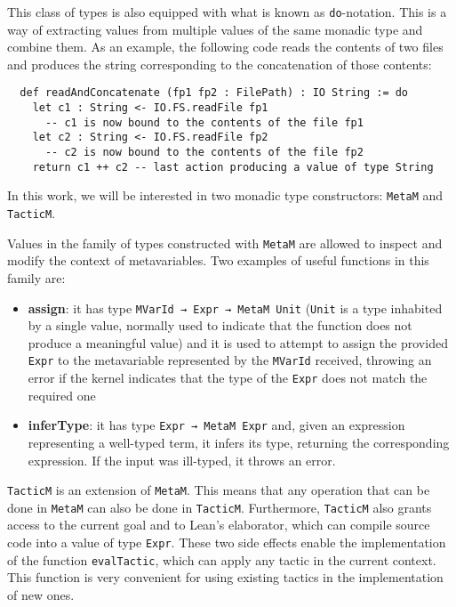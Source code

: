 This class of types is also equipped with what is known as \texttt{do}-notation. This is a way of extracting values from multiple values of the same monadic type and combine them. As an example, the following code reads the contents of two files and produces the string corresponding to the concatenation of those contents:

\begin{verbatim}
  def readAndConcatenate (fp1 fp2 : FilePath) : IO String := do
    let c1 : String <- IO.FS.readFile fp1
      -- c1 is now bound to the contents of the file fp1
    let c2 : String <- IO.FS.readFile fp2
      -- c2 is now bound to the contents of the file fp2
    return c1 ++ c2 -- last action producing a value of type String
\end{verbatim}

In this work, we will be interested in two monadic type constructors: \texttt{MetaM} and \texttt{TacticM}.

Values in the family of types constructed with \texttt{MetaM} are allowed to inspect and modify the context of metavariables. Two examples of useful functions in this family are:

\begin{itemize}
  \item \textbf{assign}: it has type \texttt{MVarId → Expr → MetaM Unit} (\texttt{Unit} is a type inhabited by a single value, normally used to indicate that the function does not produce a meaningful value) and it is used to attempt to assign the provided \texttt{Expr} to the metavariable represented by the \texttt{MVarId} received, throwing an error if the kernel indicates that the type of the \texttt{Expr} does not match the required one
  \item \textbf{inferType}: it has type \texttt{Expr → MetaM Expr} and, given an expression representing a well-typed term, it infers its type, returning the corresponding expression. If the input was ill-typed, it throws an error.
\end{itemize}

\texttt{TacticM} is an extension of \texttt{MetaM}. This means that any operation that can be done in \texttt{MetaM} can also be done in \texttt{TacticM}. Furthermore, \texttt{TacticM} also grants access to the current goal and to Lean's elaborator, which can compile source code into a value of type \texttt{Expr}. These two side effects enable the implementation of the function \texttt{evalTactic}, which can apply any tactic in the current context. This function is very convenient for using existing tactics in the implementation of new ones.

